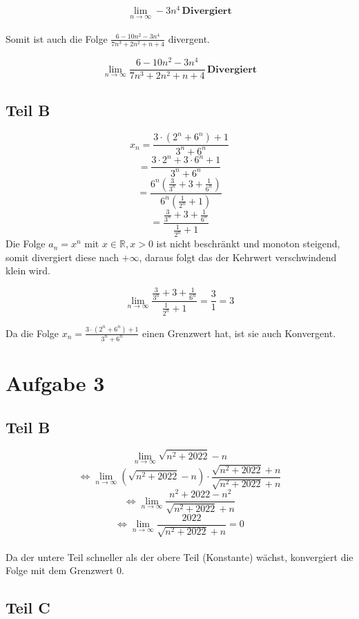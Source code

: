 \documentclass[a4paper,tikz]{article}
\begin{document}
\[\lim_{n \rightarrow \infty} -3n^4 \, \mathbf{Divergiert}\]
\\
Somit ist auch die Folge $\frac{6-10n^2-3n^4}{7n^3 + 2n^2 + n + 4 }$ divergent.

\[\lim_{n \rightarrow \infty} \frac{6-10n^2-3n^4}{7n^3 + 2n^2 + n + 4 } \, \mathbf{Divergiert}\]

\subsection{Teil B}

\[ x_n = \frac{3 \cdot (2^n + 6^n) + 1}{3^n + 6^n} \]
\[ = \frac{3 \cdot 2^n + 3 \cdot 6^n + 1}{3^n + 6^n}\]
\[ = \frac{6^n (\frac{3}{3^n} + 3 + \frac{1}{6^n})}{6^n(\frac{1}{2^n} + 1 )}\]
\[ = \frac{\frac{3}{3^n} + 3 + \frac{1}{6^n}}{\frac{1}{2^n} + 1 }\]
Die Folge $a_n = x^n$ mit $x \in \mathbb{R}, x > 0$ ist nicht beschränkt und monoton steigend, somit divergiert diese nach $+ \infty$, daraus folgt das der Kehrwert verschwindend klein wird. 

\[ \lim_{n \rightarrow \infty} \frac{\frac{3}{3^n} + 3 + \frac{1}{6^n}}{\frac{1}{2^n} + 1 } = \frac{3}{1} = 3\]


Da die Folge $x_n = \frac{3 \cdot (2^n + 6^n) + 1}{3^n + 6^n}$ einen Grenzwert hat, ist sie auch Konvergent.

\section{Aufgabe 3}



\subsection{Teil B}

\[ \lim_{n \rightarrow \infty} \sqrt{n^2 + 2022} - n  \]
\[ \Longleftrightarrow \lim_{n \rightarrow \infty} (\sqrt{n^2 + 2022} - n) \cdot \frac{\sqrt{n^2 + 2022} + n}{\sqrt{n^2 + 2022} + n} \]
\[ \Longleftrightarrow \lim_{n \rightarrow \infty} \frac{n^2 + 2022 - n^2}{\sqrt{n^2 + 2022} + n}\]
\[ \Longleftrightarrow \lim_{n \rightarrow \infty} \frac{2022}{\sqrt{n^2 + 2022} + n} = 0\]
\\
Da der untere Teil schneller als der obere Teil (Konstante) wächst, konvergiert die Folge mit dem Grenzwert 0.

\subsection{Teil C}
\end{document}
